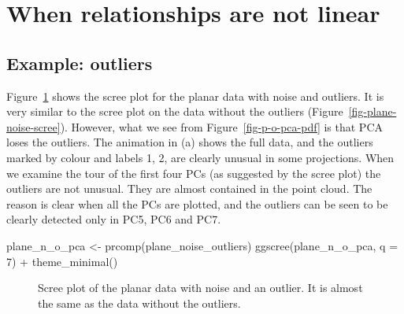 \documentclass[
  letterpaper,
]{krantz}
\newenvironment{Shaded}{\begin{snugshade}}{\end{snugshade}}
\newcommand{\AttributeTok}[1]{\textcolor[rgb]{0.40,0.45,0.13}{#1}}
\newcommand{\DecValTok}[1]{\textcolor[rgb]{0.68,0.00,0.00}{#1}}
\newcommand{\FunctionTok}[1]{\textcolor[rgb]{0.28,0.35,0.67}{#1}}
\newcommand{\NormalTok}[1]{\textcolor[rgb]{0.00,0.23,0.31}{#1}}
\newcommand{\OtherTok}[1]{\textcolor[rgb]{0.00,0.23,0.31}{#1}}
\newcommand{\SpecialCharTok}[1]{\textcolor[rgb]{0.37,0.37,0.37}{#1}}
\begin{document}
\section{When relationships are not
linear}\label{when-relationships-are-not-linear}

\subsection{Example: outliers}\label{example-outliers}


Figure~\ref{fig-plane-n-o-scree} shows the scree plot for the planar
data with noise and outliers. It is very similar to the scree plot on
the data without the outliers (Figure~\ref{fig-plane-noise-scree}).
However, what we see from Figure~\ref{fig-p-o-pca-pdf} is that PCA loses
the outliers. The animation in (a) shows the full data, and the outliers
marked by colour and labels 1, 2, are clearly unusual in some
projections. When we examine the tour of the first four PCs (as
suggested by the scree plot) the outliers are not unusual. They are
almost contained in the point cloud. The reason is clear when all the
PCs are plotted, and the outliers can be seen to be clearly detected
only in PC5, PC6 and PC7.

\begin{Shaded}
\begin{Highlighting}[]
\NormalTok{plane\_n\_o\_pca }\OtherTok{\textless{}{-}} \FunctionTok{prcomp}\NormalTok{(plane\_noise\_outliers)}
\FunctionTok{ggscree}\NormalTok{(plane\_n\_o\_pca, }\AttributeTok{q =} \DecValTok{7}\NormalTok{) }\SpecialCharTok{+} \FunctionTok{theme\_minimal}\NormalTok{()}
\end{Highlighting}
\end{Shaded}

\begin{figure}[H]


\caption{\label{fig-plane-n-o-scree}Scree plot of the planar data with
noise and an outlier. It is almost the same as the data without the
outliers.}

\end{figure}%
\end{document}

